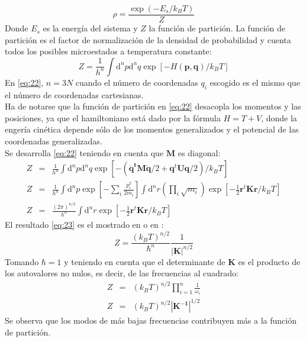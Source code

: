 \begin{equation}\label{eq:21}
\rho=\frac{\exp(-E_s/k_BT)}{Z}
\end{equation}
Donde $E_s$ es la energ\'{i}a del sistema y $Z$ la funci\'{o}n de partici\'{o}n. La funci\'{o}n de partici\'{o}n es el factor de normalizaci\'{o}n de la densidad de probabilidad y cuenta todos los posibles microestados a temperatura constante:
\begin{equation}\label{eq:22}
Z=\frac{1}{h^{n}}\int \mathrm{d}^n p\mathrm{d}^n q \exp \left [-H(\mathbf{p},\mathbf{q})/k_BT \right]
\end{equation}
En \eqref{eq:22}, $n=3N$ cuando el n\'{u}mero de coordenadas $q_i$ escogido es el mismo que el n\'{u}mero de coordenadas cartesianas.\\
Ha de notarse que la funci\'{o}n de partici\'{o}n en \eqref{eq:22} desacopla los momentos y las posiciones, ya que el hamiltoniano est\'{a} dado por la f\'{o}rmula $H=T+V$, donde la enger\'{i}a cin\'{e}tica depende s\'{o}lo de los momentos generalizados y  el potencial de las coordenadas generalizadas.\\

Se desarrolla \eqref{eq:22} teniendo en cuenta que $\mathbf{M}$ es diagonal:
\begin{eqnarray}\label{eq:23}
Z&=&\frac{1}{h^{n}}\int \mathrm{d}^n p\mathrm{d}^n q \exp \left [-\left( \mathbf{\dot{q}^t}\mathbf{M}\mathbf{\dot{q}}/2+\mathbf{q}^t\mathbf{U}\mathbf{q}/2\right)/k_BT \right]
\nonumber \\
Z&=&\frac{1}{h^{n}}\int \mathrm{d}^n p \exp \left [-\sum_i \frac{p_i^2}{2m_i}\right]
\int \mathrm{d}^n r \left( \prod_i \sqrt{m_i}\right)\exp \left[-\frac{1}{2}\mathbf{r}^t\mathbf{K}\mathbf{r}/k_BT \right]
\nonumber \\
Z&=&\frac{(2\pi)^{n/2}}{h^{n}}
\int \mathrm{d}^n r\exp \left[-\frac{1}{2}\mathbf{r}^t\mathbf{K}\mathbf{r}/k_BT \right] 
\end{eqnarray}
El resultado \eqref{eq:23} es el mostrado en \cite{Lezon2009} o en \cite{Sethna2006}:
\begin{equation}\label{eq:24}
Z=\frac{\left(k_BT\right)^{n/2}}{\hbar^{n}} \frac{1}{|\mathbf{K}|^{n/2}}
\end{equation}
Tomando $\hbar=1$ y teniendo en cuenta que el determinante de $\mathbf{K}$ es el producto de los autovalores no nulos, es decir, de las frecuencias al cuadrado:
\begin{eqnarray}\label{eq:25}
Z&=&\left(k_BT\right)^{n/2} \prod_{i=1}^{n}\frac{1}{\omega_i}
 \\
Z&=&\left(k_BT\right)^{n/2} |\mathbf{K^{-1}}|^{1/2}
\end{eqnarray}
Se observa que los modos de m\'{a}s bajas frecuencias contribuyen m\'{a}s a la funci\'{o}n de partici\'{o}n.
